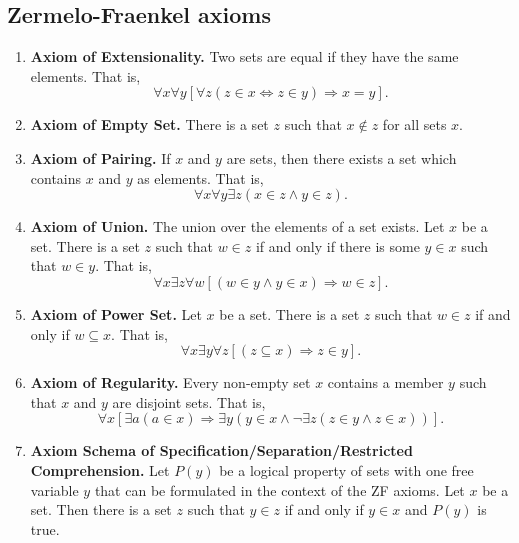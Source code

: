 \documentclass[a4paper,english,12pt]{article}
\begin{document}
\subsection{Zermelo-Fraenkel axioms}
\begin{enumerate}
	\item \textbf{Axiom of Extensionality.} Two sets are equal if they have the same elements. That is,
\begin{equation*}
 \forall x \forall y [\forall z (z\in {x} \Leftrightarrow z\in {y}) \Rightarrow {x}={y}].
\end{equation*}
	\item \textbf{Axiom of Empty Set.} There is a set $z$ such that $x \notin z$ for all sets $x$.
	\item \textbf{Axiom of Pairing.} If ${x}$ and ${y}$ are sets, then there exists a set which contains ${x}$ and ${y}$ as elements. That is,
\begin{equation*}
 \forall x \forall y \exists z (x \in z  \wedge  y\in z).
\end{equation*}
	\item \textbf{Axiom of Union.} The union over the elements of a set exists. Let $x$ be a set. There is a set $z$ such that $w \in z$ if and only if there is some $y \in x$ such that $w \in y$. That is,
\begin{equation*}
 \forall x \exists z \forall w [(w \in y  \wedge  y \in x) \Rightarrow w \in z].
\end{equation*}
	\item \textbf{Axiom of Power Set.} Let ${x}$ be a set. There is a set $z$ such that $w \in z$ if and only if
$w \subseteq x$. That is,
\begin{equation*}
 \forall x \exists y \forall z [(z \subseteq x) \Rightarrow z \in y].
\end{equation*}
	\item \textbf{Axiom of Regularity.} Every non-empty set ${x}$ contains a member ${y}$ such that
 ${x}$ and ${y}$ are disjoint sets. That is,
\begin{equation*}
 \forall x [\exists a (a \in x) \Rightarrow \exists y (y \in x \wedge \neg \exists z(z \in y \wedge z \in x))].
\end{equation*}
	\item \textbf{Axiom Schema of Specification/Separation/Restricted Comprehension.} Let $P(y)$ be a logical property of sets with one free variable $y$ that can be formulated in the context of the ZF axioms. Let ${x}$ be a set. Then
there is a set ${z}$ such that $y \in{z}$ if and only if $y \in {x}$ and $P(y)$ is true.


\end{enumerate}
\end{document}

